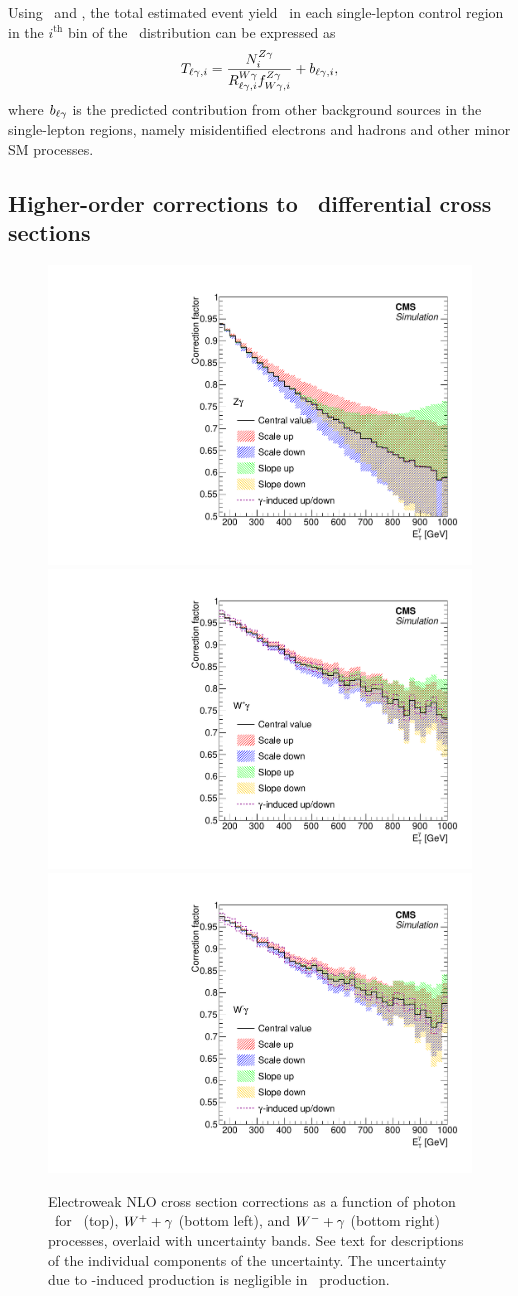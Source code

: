 Using \RWl\ and \fZW, the total estimated event yield \Tl\ in each single-lepton control region in the $i^\mathrm{th}$ bin of the \ETg\ distribution can be expressed as
\begin{equation}
  \Tl[,i] = \frac{\NZg[i]}{\RWl[,i]\fZW[,i]} + b_{\ell\Pgg,i},
\end{equation}
where $b_{\ell\Pgg}$ is the predicted contribution from other background sources in the single-lepton regions, namely misidentified electrons and hadrons and other minor SM processes.

\subsection{Higher-order corrections to \vg\ differential cross sections}
\label{sec:theory_uncertainties}

\begin{figure}[htbp]
  \centering
  \includegraphics[width=0.48\linewidth]{Analysis/Figures/ewkcorr_zg.pdf} \\
  \includegraphics[width=0.48\linewidth]{Analysis/Figures/ewkcorr_wgplus.pdf}
  \includegraphics[width=0.48\linewidth]{Analysis/Figures/ewkcorr_wgminus.pdf}
  \caption{
    Electroweak NLO cross section corrections as a function of photon \pt\ for \zinvg\ (top), $\PW^{+}+\Pgg$ (bottom left), and $\PW^{-}+\Pgg$ (bottom right) processes, overlaid with uncertainty bands. 
    See text for descriptions of the individual components of the uncertainty.
    The uncertainty due to \Pgg-induced production is negligible in \zinvg\ production.
  }
  \label{fig:ewk_correction}
\end{figure}


